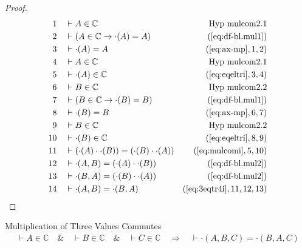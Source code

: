 \begin{proof}
\begin{align}
  1 &&  & \vdash A \in \mathbb{C}&\text{Hyp~mulcom2.1}\notag%
  \\ 2 &&  & \vdash ( A \in \mathbb{C} \rightarrow \cdot( A ) = A )&(\mbox{\ref{eq:df-bl.mul1}})\notag
  \\ 3 &&  & \vdash \cdot( A ) = A&(\mbox{\ref{eq:ax-mp}},1,2)\notag
  \\ 4 &&  & \vdash A \in \mathbb{C}&\text{Hyp~mulcom2.1}\notag%
  \\ 5 &&  & \vdash \cdot( A ) \in \mathbb{C}&(\mbox{\ref{eq:eqeltri}},3,4)\notag
  \\ 6 &&  & \vdash B \in \mathbb{C}&\text{Hyp~mulcom2.2}\notag%
  \\ 7 &&  & \vdash ( B \in \mathbb{C} \rightarrow \cdot( B ) = B )&(\mbox{\ref{eq:df-bl.mul1}})\notag
  \\ 8 &&  & \vdash \cdot( B ) = B&(\mbox{\ref{eq:ax-mp}},6,7)\notag
  \\ 9 &&  & \vdash B \in \mathbb{C}&\text{Hyp~mulcom2.2}\notag%
  \\ 10 &&  & \vdash \cdot( B ) \in \mathbb{C}&(\mbox{\ref{eq:eqeltri}},8,9)\notag
  \\ 11 &&  & \vdash ( \cdot( A ) \cdot \cdot( B ) ) = ( \cdot( B ) \cdot \cdot( A ) )&(\mbox{\ref{eq:mulcomi}},5,10)\notag
  \\ 12 &&  & \vdash \cdot( A , B ) = ( \cdot( A ) \cdot \cdot( B ) )&(\mbox{\ref{eq:df-bl.mul2}})\notag
  \\ 13 &&  & \vdash \cdot( B , A ) = ( \cdot( B ) \cdot \cdot( A ) )&(\mbox{\ref{eq:df-bl.mul2}})\notag
  \\ 14 &&  & \vdash \cdot( A , B ) = \cdot( B , A )&(\mbox{\ref{eq:3eqtr4i}},11,12,13)\notag
\end{align}
\end{proof}

\begin{lemma} Multiplication of Three Values
Commutes
\begin{align}
\vdash A \in \mathbb{C}\quad\&\quad \vdash B \in \mathbb{C}\quad\&\quad \vdash
    C \in \mathbb{C}\quad\Rightarrow\quad \vdash \cdot( A , B , C ) = \cdot( B
    , A , C )\label{eq:bl.mulcom3bac}\tag{bl.mulcom3bac}
\end{align}
\end{lemma}

